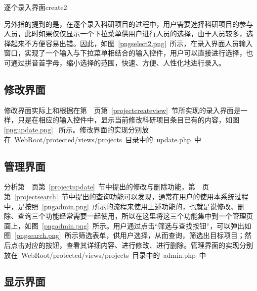 \begin{pics}[htbp]{逐个录入界面}{create2}
\end{pics}

另外指的提到的是，在逐个录入科研项目的过程中，用户需要选择科研项目的参与人员，此时如果仅仅显示一个下拉菜单供用户进行人员的选择，由于人员较多，选择起来不方便容易出错。因此，如图~\ref{pngselect2.png}~所示，在录入界面人员输入窗口，实现了一个输入与下拉菜单相结合的输入控件，用户可以直接进行选择，也可通过拼音首字母，缩小选择的范围，快速、方便、人性化地进行录入。



\subsection{修改界面}

修改界面实际上和根据在第~\pageref{projectcreateview}~页第~\ref{projectcreateview}~节所实现的录入界面是一样，只是在相应的输入控件中，显示当前修改科研项目条目已有的内容，如图\ref{pngupdate.png}~
所示。修改界面的实现分别放在~WebRoot/protected/views/projects~目录中的~update.php~中


\subsection{管理界面}
分析第~\pageref{projectupdate}~页第~\ref{projectupdate}~节中提出的修改与删除功能，第~\pageref{projectsearch}~页第~\ref{projectsearch}~节中提出的查询功能可以发现，通常在用户的使用本系统过程中，是按照~\ref{pngadmin.png}~所示的流程来使用上述功能的，也就是说修改、删除、查询三个功能经常需要一起使用，所以在这里将这三个功能集中到一个管理页面上，如图~\ref{pngadmin.png}~所示。用户通过点击“筛选与查找按钮”，可以弹出如图~\ref{pngsearch.png}~所示筛选表单，供用户选择，从而查询，筛选出目标项目；然后点击对应的按钮，查看其详细内容、进行修改、进行删除。管理界面的实现分别放在~WebRoot/protected/views/projects~目录中的~admin.php~中



\subsection{显示界面}

